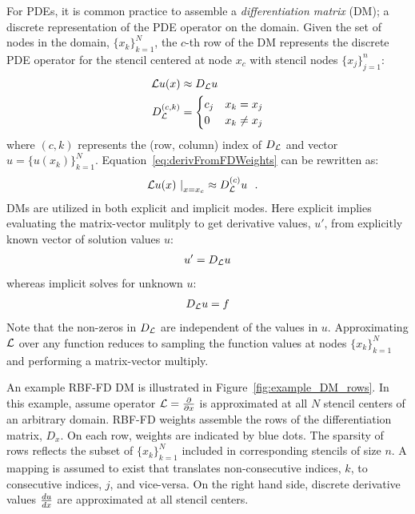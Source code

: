 \documentclass[11pt]{report}
\begin{document}
{For PDEs, it is common practice to assemble a \emph{differentiation matrix} (DM); a discrete representation of the PDE operator on the domain. Given the set of nodes in the domain, $\{x_k\}_{k=1}^N$, the $c$-th row of the DM represents the discrete PDE operator for the stencil centered at node $x_c$ with stencil nodes $\{x_j\}_{j=1}^{n}$: 
\begin{align*}
 \mathcal{L}u(x) & \approx D_{\mathcal{L}} u \\
D_{\mathcal{L}}^{(c,k)} & = \begin{cases} c_j & x_k = x_j \\
                                    0 & x_k \neq x_j \\
                                    \end{cases} 
\end{align*}
where $(c,k)$ represents the (row, column) index of $D_{\mathcal{L}}$ and vector $u = \{u(x_k)\}_{k=1}^{N}$. Equation~\ref{eq:derivFromFDWeights} can be rewritten as:
\begin{align*}
\left. \mathcal{L}u(x) \ \right|_{x = x_c} & \approx D_{\mathcal{L}}^{(c)} u \ \ .
\end{align*}
DMs are utilized in both explicit and implicit modes. Here explicit implies evaluating the matrix-vector mulitply to get derivative values, $u'$, from explicitly known vector of solution values $u$: 
\begin{align}
u' = D_{\mathcal{L}} u
\label{eq:explicit_dm}
\end{align}
whereas implicit solves for unknown $u$:
\begin{align}
D_{\mathcal{L}} u = f
\label{eq:implicit_dm}
\end{align}
Note that the non-zeros in $D_{\mathcal{L}}$ are independent of the values in $u$. Approximating $\mathcal{L}$ over any function reduces to sampling the function values at nodes $\{x_k\}_{k=1}^N$ and performing a matrix-vector multiply. 

An example RBF-FD DM is illustrated in Figure~\ref{fig:example_DM_rows}. In this example, assume operator $\mathcal{L} = \frac{\partial }{\partial x}$ is approximated at all $N$ stencil centers of an arbitrary domain. RBF-FD weights assemble the rows of the differentiation matrix, $D_{x}$. On each row, weights are indicated by blue dots. The sparsity of rows reflects the subset of $\{x_k\}_{k=1}^N$ included in corresponding stencils of size $n$. A mapping is assumed to exist that translates non-consecutive indices, $k$, to consecutive indices, $j$, and vice-versa. On the right hand side, discrete derivative values $\frac{d u}{d x}$ are approximated at all stencil centers. 

}
\end{document}

